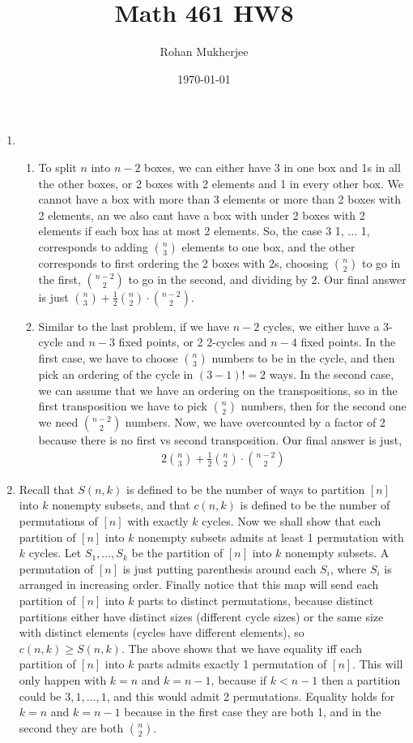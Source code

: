 \documentclass[12pt]{article}
\title{Math 461 HW8}
\date{\today}
\author{Rohan Mukherjee}
\theoremstyle{definition}
\theoremstyle{remark}
\begin{document}
	\maketitle
	\begin{enumerate}[leftmargin=\labelsep]
		\item \begin{enumerate}
			\item To split $n$ into $n-2$ boxes, we can either have 3 in one box and 1s in all the other boxes, or 2 boxes with 2 elements and 1 in every other box. We cannot have a box with more than 3 elements or more than 2 boxes with 2 elements, an we also cant have a box with under 2 boxes with 2 elements if each box has at most 2 elements. So, the case 3 1, ... 1, corresponds to adding ${n\choose 3}$ elements to one box, and the other corresponds to first ordering the 2 boxes with 2s, choosing ${n \choose 2}$ to go in the first, ${n-2 \choose 2}$ to go in the second, and dividing by 2. Our final answer is just ${n \choose 3} + \frac12 {n \choose 2} \cdot {n-2 \choose 2}$.
			
			\item Similar to the last problem, if we have $n-2$ cycles, we either have a 3-cycle and $n-3$ fixed points, or 2 2-cycles and $n-4$ fixed points. In the first case, we have to choose ${n \choose 3}$ numbers to be in the cycle, and then pick an ordering of the cycle in $(3-1)! = 2$ ways. In the second case, we can assume that we have an ordering on the transpositions, so in the first transposition we have to pick ${n \choose 2}$ numbers, then for the second one we need ${n-2 \choose 2}$ numbers. Now, we have overcounted by a factor of 2 because there is no first vs second transposition. Our final answer is just,
			\begin{align*}
				2{n \choose 3} + \frac12 {n \choose 2} \cdot {n-2 \choose 2}
			\end{align*}
		\end{enumerate}
	
		\item Recall that $S(n, k)$ is defined to be the number of ways to partition $[n]$ into $k$ nonempty subsets, and that $c(n, k)$ is defined to be the number of permutations of $[n]$ with exactly $k$ cycles. Now we shall show that each partition of $[n]$ into $k$ nonempty subsets admits at least 1 permutation with $k$ cycles. Let $S_1, \ldots, S_k$ be the partition of $[n]$ into $k$ nonempty subsets. A permutation of $[n]$ is just putting parenthesis around each $S_i$, where $S_i$ is arranged in increasing order. Finally notice that this map will send each partition of $[n]$ into $k$ parts to distinct permutations, because distinct partitions either have distinct sizes (different cycle sizes) or the same size with distinct elements (cycles have different elements), so $c(n,k) \geq S(n,k)$. The above shows that we have equality iff each partition of $[n]$ into $k$ parts admits exactly 1 permutation of $[n]$. This will only happen with $k = n$ and $k = n-1$, because if $k < n-1$ then a partition could be $3, 1, \ldots, 1$, and this would admit 2 permutations. Equality holds for $k=n$ and $k=n-1$ because in the first case they are both 1, and in the second they are both ${n \choose 2}$.
		

\end{enumerate}
\end{document}
